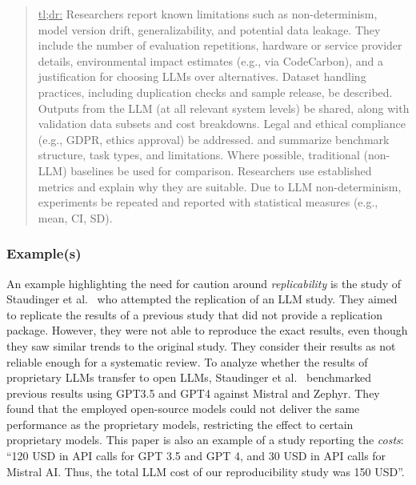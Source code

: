 \begin{quote}
\underline{tl;dr:} Researchers \must report known limitations such as non-determinism, model version drift, generalizability, and potential data leakage. They \should include the number of evaluation repetitions, hardware or service provider details, environmental impact estimates (e.g., via CodeCarbon), and a justification for choosing LLMs over alternatives. Dataset handling practices, including duplication checks and sample release, \should be described. Outputs from the LLM (at all relevant system levels) \must be shared, along with validation data subsets and cost breakdowns. Legal and ethical compliance (e.g., GDPR, ethics approval) \must be addressed. \paper and \should summarize benchmark structure, task types, and limitations. Where possible, traditional (non-LLM) baselines \should be used for comparison. Researchers \should use established metrics and \must explain why they are suitable. Due to LLM non-determinism, experiments \should be repeated and reported with statistical measures (e.g., mean, CI, SD).
\end{quote}

\subsubsection{Example(s)}

An example highlighting the need for caution around \emph{replicability} is the study of Staudinger et al.~\cite{DBLP:conf/sigir-ap/StaudingerKPLH24} who attempted the replication of an LLM study. They aimed to replicate the results of a previous study that did not provide a replication package. However, they were not able to reproduce the exact results, even though they saw similar trends to the original study. They consider their results as not reliable enough for a systematic review.
To analyze whether the results of proprietary LLMs transfer to open LLMs, Staudinger et al.~\cite{DBLP:conf/sigir-ap/StaudingerKPLH24} benchmarked previous results using GPT3.5 and GPT4 against Mistral and Zephyr. They found that the employed open-source models could not deliver the same performance as the proprietary models, restricting the effect to certain proprietary models.
This paper is also an example of a study reporting the \emph{costs}: \enquote{120 USD in API calls for GPT 3.5 and GPT 4, and 30 USD in API calls for Mistral AI. Thus, the total LLM cost of our reproducibility study was 150 USD}.

